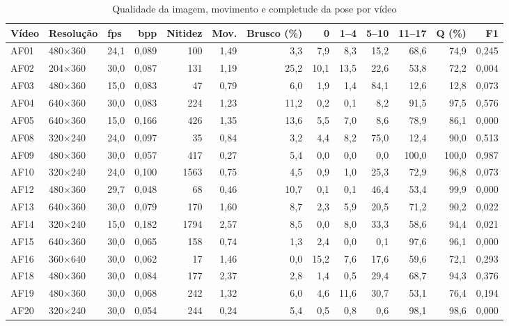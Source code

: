 \begin{table}[htbp]
\centering
\scriptsize\setlength{\tabcolsep}{3pt}
\caption{Qualidade da imagem, movimento e completude da pose por vídeo}
\label{tab:qualidade-videos}
\begin{tabular}{lllrrrrrrrrrr}
\toprule
Vídeo & Resolução & fps & bpp & Nitidez & Mov. & Brusco (\%) & 0 & 1--4 & 5--10 & 11--17 & Q (\%) & F1 \\
\midrule
AF01 & 480$\times$360 & 24,1 & 0,089 & 100 & 1,49 & 3,3 & 7,9 & 8,3 & 15,2 & 68,6 & 74,9 & 0,245 \\
AF02 & 204$\times$360 & 30,0 & 0,087 & 131 & 1,19 & 25,2 & 10,1 & 13,5 & 22,6 & 53,8 & 72,2 & 0,004 \\
AF03 & 480$\times$360 & 15,0 & 0,083 & 47 & 0,79 & 6,0 & 1,9 & 1,4 & 84,1 & 12,6 & 12,8 & 0,073 \\
AF04 & 640$\times$360 & 30,0 & 0,083 & 224 & 1,23 & 11,2 & 0,2 & 0,1 & 8,2 & 91,5 & 97,5 & 0,576 \\
AF05 & 640$\times$360 & 15,0 & 0,166 & 426 & 1,35 & 13,6 & 5,5 & 7,0 & 8,6 & 78,9 & 86,1 & 0,000 \\
AF08 & 320$\times$240 & 24,0 & 0,097 & 35 & 0,84 & 3,2 & 4,4 & 8,2 & 75,0 & 12,4 & 90,0 & 0,513 \\
AF09 & 480$\times$360 & 30,0 & 0,057 & 417 & 0,27 & 5,4 & 0,0 & 0,0 & 0,0 & 100,0 & 100,0 & 0,987 \\
AF10 & 320$\times$240 & 24,0 & 0,100 & 1563 & 0,75 & 4,5 & 0,9 & 1,0 & 25,3 & 72,9 & 96,8 & 0,073 \\
AF12 & 480$\times$360 & 29,7 & 0,048 & 68 & 0,46 & 10,7 & 0,1 & 0,1 & 46,4 & 53,4 & 99,9 & 0,000 \\
AF13 & 640$\times$360 & 30,0 & 0,079 & 170 & 1,60 & 8,7 & 2,3 & 5,9 & 20,5 & 71,2 & 90,2 & 0,022 \\
AF14 & 320$\times$240 & 15,0 & 0,182 & 1794 & 2,57 & 8,5 & 0,0 & 8,0 & 33,3 & 58,6 & 94,4 & 0,021 \\
AF15 & 640$\times$360 & 30,0 & 0,065 & 158 & 0,74 & 1,3 & 2,4 & 0,0 & 0,1 & 97,6 & 96,1 & 0,000 \\
AF16 & 360$\times$640 & 30,0 & 0,062 & 17 & 1,46 & 0,0 & 15,2 & 7,6 & 17,6 & 59,6 & 72,1 & 0,293 \\
AF18 & 480$\times$360 & 30,0 & 0,084 & 177 & 2,37 & 2,8 & 1,4 & 0,5 & 29,4 & 68,7 & 94,3 & 0,376 \\
AF19 & 480$\times$360 & 30,0 & 0,068 & 242 & 1,32 & 6,0 & 4,6 & 11,6 & 30,7 & 53,1 & 76,4 & 0,194 \\
AF20 & 320$\times$240 & 30,0 & 0,054 & 244 & 0,24 & 5,4 & 0,5 & 0,8 & 0,6 & 98,1 & 98,6 & 0,000 \\

\end{tabular}
\end{table}

